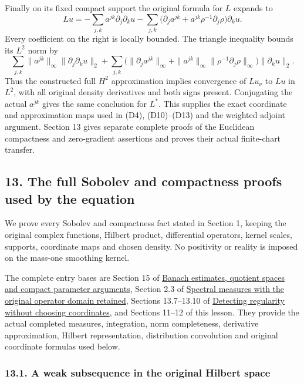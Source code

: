 \documentclass[
  11pt,
]{article}
\begin{document}
Finally on its fixed compact support the original formula for \(L\)
expands to \[
 Lu=-\sum_{j,k}a^{jk}\partial_j\partial_k u
       -\sum_{j,k}\bigl(\partial_j a^{jk}
                  +a^{jk}\rho^{-1}\partial_j\rho\bigr)\partial_k u .
                                                               \tag{CX19}
\] Every coefficient on the right is locally bounded. The triangle
inequality bounds its \(L^2\) norm by \[
 \sum_{j,k}\|a^{jk}\|_\infty\|\partial_j\partial_k u\|_2
 +\sum_{j,k}
   \bigl(\|\partial_j a^{jk}\|_\infty
       +\|a^{jk}\|_\infty\|\rho^{-1}\partial_j\rho\|_\infty\bigr)
          \|\partial_k u\|_2 .
\] Thus the constructed full \(H^2\) approximation implies convergence
of \(Lu_\nu\) to \(Lu\) in \(L^2\), with all original density
derivatives and both signs present. Conjugating the actual \(a^{jk}\)
gives the same conclusion for \(L^*\). This supplies the exact
coordinate and approximation maps used in (D4), (D10)--(D13) and the
weighted adjoint argument. Section 13 gives separate complete proofs of
the Euclidean compactness and zero-gradient assertions and proves their
actual finite-chart transfer.

\subsection{13. The full Sobolev and compactness proofs used by the
equation}\label{the-full-sobolev-and-compactness-proofs-used-by-the-equation}

We prove every Sobolev and compactness fact stated in Section 1, keeping
the original complex functions, Hilbert product, differential operators,
kernel scales, supports, coordinate maps and chosen density. No
positivity or reality is imposed on the mass-one smoothing kernel.

The complete entry bases are Section 15 of
\href{banach-foundation-bridges.pdf}{Banach estimates, quotient spaces
and compact parameter arguments}, Section 2.3 of
\href{lower-bounded-spectral-calculus.pdf}{Spectral measures with the
original operator domain retained}, Sections 13.7--13.10 of
\href{geometric-microlocal-calculus.pdf}{Detecting regularity without
choosing coordinates}, and Sections 11--12 of this lesson. They provide
the actual completed measures, integration, norm completeness,
derivative approximation, Hilbert representation, distribution
convolution and original coordinate formulas used below.

\subsubsection{13.1. A weak subsequence in the original Hilbert
space}\label{a-weak-subsequence-in-the-original-hilbert-space}
\end{document}
